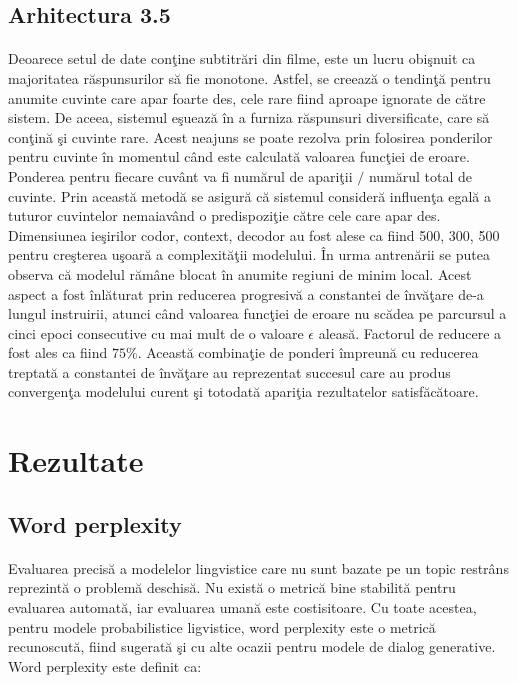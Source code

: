 \subsection{Arhitectura 3.5}

\paragraph{}
Deoarece setul de date con\c tine subtitr\u ari din filme, este un lucru obi\c snuit ca majoritatea r\u aspunsurilor s\u a fie monotone. Astfel, se creeaz\u a o tendin\c t\u a pentru anumite cuvinte care apar foarte des, cele rare fiind aproape ignorate de c\u atre sistem. De aceea, sistemul e\c sueaz\u a \^ in a furniza r\u aspunsuri diversificate, care s\u a con\c tin\u a \c si cuvinte rare. Acest neajuns se poate rezolva prin folosirea ponderilor pentru cuvinte \^ in momentul c\^ and este calculat\u a valoarea func\c tiei de eroare. Ponderea pentru fiecare cuv\^ ant va fi num\u arul de apari\c tii \(/\) num\u arul total de cuvinte. Prin aceast\u a metod\u a se asigur\u a c\u a sistemul consider\u a influen\c ta egal\u a a tuturor cuvintelor nemaiav\^ and o predispozi\c tie c\u atre cele care apar des. Dimensiunea ie\c sirilor codor, context, decodor au fost alese ca fiind 500, 300, 500 pentru cre\c sterea u\c soar\u a a complexit\u a\c tii modelului. \^ In urma antren\u arii se putea observa c\u a modelul r\u am\^ ane blocat \^ in anumite regiuni de minim local. Acest aspect a fost \^ inl\u aturat prin reducerea progresiv\u a a constantei de \^ inv\u a\c tare de-a lungul instruirii, atunci c\^ and valoarea func\c tiei de eroare nu sc\u adea pe parcursul a cinci epoci consecutive cu mai mult de o valoare \(\epsilon\) aleas\u a. Factorul de reducere a fost ales ca fiind \(75\%\). Aceast\u a combina\c tie de ponderi \^ impreun\u a cu reducerea treptat\u a a constantei de \^ inv\u a\c tare au reprezentat succesul care au produs convergen\c ta modelului curent \c si totodat\u a apari\c tia rezultatelor satisf\u ac\u atoare.

\section{Rezultate}

\subsection{Word perplexity}

\paragraph{}
Evaluarea precis\u a a modelelor lingvistice care nu sunt bazate pe un topic restr\^ ans reprezint\u a o problem\u a deschis\u a. Nu exist\u a o metric\u a bine stabilit\u a pentru evaluarea automat\u a, iar evaluarea uman\u a este costisitoare. Cu toate acestea, pentru modele probabilistice ligvistice, word perplexity \cite{Bengio:2003:NPL:944919.944966} este o metric\u a recunoscut\u a, fiind sugerat\u a \c si cu alte ocazii pentru modele de dialog generative. Word perplexity este definit ca:

